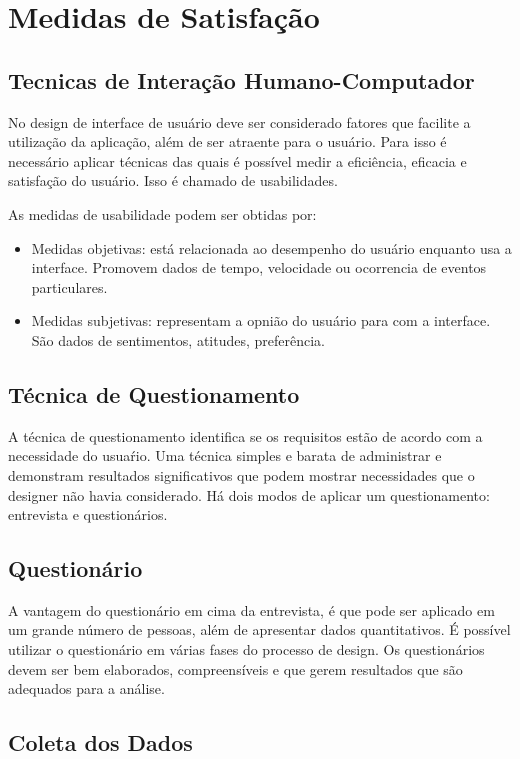 \chapter[Medidas de Satisfação]{Medidas de Satisfação}
\section{Tecnicas de Interação Humano-Computador}
No design de interface de usuário deve ser considerado fatores que facilite a utilização da aplicação, além de ser atraente para o usuário. Para isso é necessário aplicar técnicas das quais é possível medir a eficiência, eficacia e satisfação do usuário. Isso é chamado de usabilidades.

As medidas de usabilidade podem ser obtidas por:

\begin{itemize}
	\item Medidas objetivas: está relacionada ao desempenho do usuário enquanto usa a interface. Promovem dados de tempo, velocidade ou ocorrencia de eventos particulares.
	\item Medidas subjetivas: representam a opnião do usuário para com a interface. São dados de sentimentos, atitudes, preferência.
\end{itemize}

\section{Técnica de Questionamento}

A técnica de questionamento identifica se os requisitos estão de acordo com a necessidade do usuaŕio. Uma técnica simples e barata de administrar e demonstram resultados significativos que podem mostrar necessidades que o designer não havia considerado.
Há dois modos de aplicar um questionamento: entrevista e questionários.

\section{Questionário}

 A vantagem do questionário em cima da entrevista, é que pode ser aplicado em um grande número de pessoas, além de apresentar dados quantitativos. É possível utilizar o questionário em várias fases do processo de design.
 Os questionários devem ser bem elaborados, compreensíveis e que gerem resultados que são adequados para a análise.

 \section{Coleta dos Dados}

